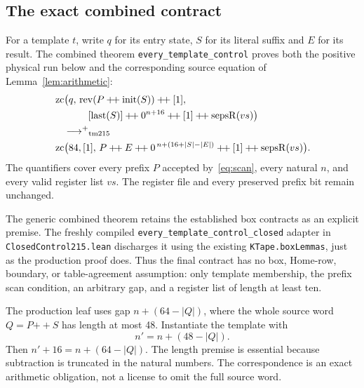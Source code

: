 \subsection{The exact combined contract}
For a template $t$, write $q$ for its entry state, $S$ for its literal suffix and $E$ for its result. The combined theorem \texttt{every\_template\_control} proves both the positive physical run below and the corresponding source equation of Lemma~\ref{lem:arithmetic}:
\begin{align*}
 &\operatorname{zc}\bigl(q,\,
   \rev(P\mathbin{+\!+}\operatorname{init}(S))\mathbin{+\!+}[1],\\
 &\hspace{3.5em}
   [\operatorname{last}(S)]\mathbin{+\!+}0^{n+16}
       \mathbin{+\!+}[1]\mathbin{+\!+}\operatorname{sepsR}(vs)\bigr)\\
 &\quad\PosReach_{\mathrm{tm215}}\\
 &\operatorname{zc}\bigl(84,[1],\,
   P\mathbin{+\!+}E\mathbin{+\!+}0^{\,n+(16+|S|-|E|)}
       \mathbin{+\!+}[1]\mathbin{+\!+}\operatorname{sepsR}(vs)\bigr).
\end{align*}
The quantifiers cover every prefix $P$ accepted by~\eqref{eq:scan}, every natural $n$, and every valid register list $vs$. The register file and every preserved prefix bit remain unchanged.

The generic combined theorem retains the established box contracts as an explicit premise. The freshly compiled \texttt{every\_template\_control\_closed} adapter in \texttt{ClosedControl215.lean} discharges it using the existing \texttt{KTape.boxLemmas}, just as the production proof does. Thus the final contract has no box, Home-row, boundary, or table-agreement assumption: only template membership, the prefix scan condition, an arbitrary gap, and a register list of length at least ten.

The production leaf uses gap $n+(64-|Q|)$, where the whole source word $Q=P\mathbin{+\!+}S$ has length at most 48. Instantiate the template with
\[
 n'=n+(48-|Q|).
\]
Then $n'+16=n+(64-|Q|)$. The length premise is essential because subtraction is truncated in the natural numbers. The correspondence is an exact arithmetic obligation, not a license to omit the full source word.

